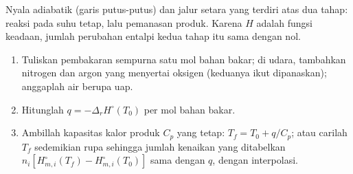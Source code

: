 \begin{omfigure}

{\small Nyala adiabatik (garis putus-putus) dan jalur setara yang terdiri
atas dua tahap: reaksi pada suhu tetap, lalu pemanasan produk. Karena $H$
adalah fungsi keadaan, jumlah perubahan entalpi kedua tahap itu sama
dengan nol.}
\end{omfigure}

\begin{method}\label{met:b2:reaction-enthalpy:flame-temperature}
\begin{enumerate}
  \item Tuliskan pembakaran sempurna satu mol bahan bakar; di udara,
        tambahkan nitrogen dan argon yang menyertai oksigen (keduanya ikut
        dipanaskan); anggaplah air berupa uap.
  \item Hitunglah $q = -\Delta_r H^\circ(T_0)$ per mol bahan bakar.
  \item Ambillah kapasitas kalor produk $C_p$ yang tetap:
        $T_f = T_0 + q/C_p$; atau carilah $T_f$ sedemikian rupa sehingga
        jumlah kenaikan yang ditabelkan
        $n_i[H^\circ_{m,i}(T_f) - H^\circ_{m,i}(T_0)]$ sama dengan $q$,
        dengan interpolasi.
\end{enumerate}
\end{method}


